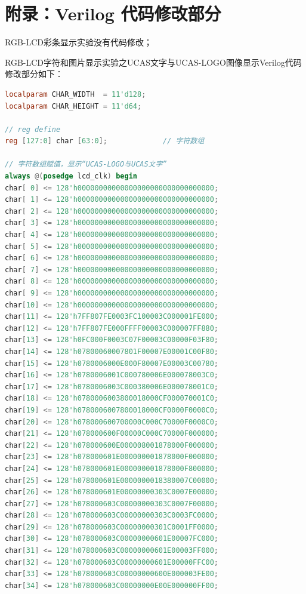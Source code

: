 \documentclass[UTF8]{article}
\theoremstyle{MyLineTheoremStyle} %
\theoremstyle{MyBlockTheoremStyle} %
\theoremstyle{MySubsubsectionStyle} %
\begin{document}
\cleardoublepage
\section{附录：Verilog 代码修改部分}
RGB-LCD彩条显示实验没有代码修改；\par
RGB-LCD字符和图片显示实验之UCAS文字与UCAS-LOGO图像显示Verilog代码修改部分如下：
\begin{lstlisting}[language=Verilog, caption={UCAS文字与UCAS-LOGO图像显示Verilog代码修改部分}, label={lst:verilog_code}]
localparam CHAR_WIDTH  = 11'd128;
localparam CHAR_HEIGHT = 11'd64;  

// reg define
reg [127:0] char [63:0];             // 字符数组

// 字符数组赋值，显示“UCAS-LOGO与UCAS文字”
always @(posedge lcd_clk) begin
char[ 0] <= 128'h00000000000000000000000000000000;
char[ 1] <= 128'h00000000000000000000000000000000;
char[ 2] <= 128'h00000000000000000000000000000000;
char[ 3] <= 128'h00000000000000000000000000000000;
char[ 4] <= 128'h00000000000000000000000000000000;
char[ 5] <= 128'h00000000000000000000000000000000;
char[ 6] <= 128'h00000000000000000000000000000000;
char[ 7] <= 128'h00000000000000000000000000000000;
char[ 8] <= 128'h00000000000000000000000000000000;
char[ 9] <= 128'h00000000000000000000000000000000;
char[10] <= 128'h00000000000000000000000000000000;
char[11] <= 128'h7FF807FE0003FC100003C000001FE000;
char[12] <= 128'h7FF807FE000FFFF00003C000007FF880;
char[13] <= 128'h0FC000F0003C07F00003C00000F03F80;
char[14] <= 128'h07800060007801F00007E00001C00F80;
char[15] <= 128'h0780006000E000F80007E00003C00780;
char[16] <= 128'h0780006001C000780006E000078003C0;
char[17] <= 128'h0780006003C000380006E000078001C0;
char[18] <= 128'h0780006003800018000CF000070001C0;
char[19] <= 128'h0780006007800018000CF0000F0000C0;
char[20] <= 128'h078000600700000C000C70000F0000C0;
char[21] <= 128'h078000600F00000C000C70000F000000;
char[22] <= 128'h078000600E000008001878000F000000;
char[23] <= 128'h078000601E000000001878000F000000;
char[24] <= 128'h078000601E000000001878000F800000;
char[25] <= 128'h078000601E0000000018380007C00000;
char[26] <= 128'h078000601E00000000303C0007E00000;
char[27] <= 128'h078000603C00000000303C0007F00000;
char[28] <= 128'h078000603C00000000303C0003FC0000;
char[29] <= 128'h078000603C00000000301C0001FF0000;
char[30] <= 128'h078000603C00000000601E00007FC000;
char[31] <= 128'h078000603C00000000601E00003FF000;
char[32] <= 128'h078000603C00000000601E00000FFC00;
char[33] <= 128'h078000603C00000000600E000003FE00;
char[34] <= 128'h078000603C00000000E00E000000FF00;

\end{lstlisting}
\end{document}
